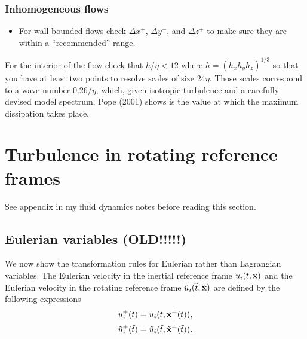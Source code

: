 \documentclass[oneside,a4paper,11pt]{report}
\begin{document}
\subsection{Inhomogeneous flows}
\begin{itemize}
\item For wall bounded flows check $\Delta x^+$, $\Delta y^+$, and $\Delta z^+$ to make sure they are within a ``recommended'' range.
\end{itemize}

For the interior of the flow check that $h/\eta < 12$ where $h = (h_x h_y h_z)^{1/3}$ so that you have at least two points to resolve scales of size $24 \eta$. Those scales correspond to a wave number $0.26/\eta$, which, given isotropic turbulence and a carefully devised model spectrum, Pope (2001) shows is the value at which the maximum dissipation takes place.


\appendix

\chapter{Turbulence in rotating reference frames}

See appendix in my fluid dynamics notes before reading this section.

\section{Eulerian variables (OLD!!!!!)}
We now show the transformation rules for Eulerian rather than Lagrangian variables. The Eulerian velocity in the inertial reference frame $u_i(t,\mathbf{x})$ and the Eulerian velocity in the rotating reference frame $\tilde{u}_i(\tilde{t}, \tilde{\mathbf{x}})$ are defined by the following expressions
\begin{equation}
    u_i^+(t) = u_i(t, \mathbf{x}^+(t)),
\end{equation}
\begin{equation}
    \tilde{u}^+_i(\tilde{t}) = \tilde{u}_i(\tilde{t},\tilde{\mathbf{x}}^+(\tilde{t})).
\end{equation}
\end{document}
